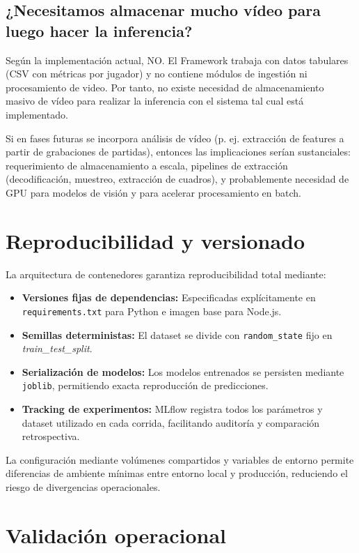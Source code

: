 \documentclass{ULBreport} %
\begin{document}
\subsection{¿Necesitamos almacenar mucho vídeo para luego hacer la inferencia?}

Según la implementación actual, NO. El Framework trabaja con datos tabulares (CSV con métricas por jugador) y no contiene módulos de ingestión ni procesamiento de video. Por tanto, no existe necesidad de almacenamiento masivo de vídeo para realizar la inferencia con el sistema tal cual está implementado.

Si en fases futuras se incorpora análisis de vídeo (p. ej. extracción de features a partir de grabaciones de partidas), entonces las implicaciones serían sustanciales: requerimiento de almacenamiento a escala, pipelines de extracción (decodificación, muestreo, extracción de cuadros), y probablemente necesidad de GPU para modelos de visión y para acelerar procesamiento en batch.

\section{Reproducibilidad y versionado}

La arquitectura de contenedores garantiza reproducibilidad total mediante:

\begin{itemize}
    \item \textbf{Versiones fijas de dependencias:} Especificadas explícitamente en \texttt{requirements.txt} para Python e imagen base para Node.js.
    \item \textbf{Semillas deterministas:} El dataset se divide con \texttt{random\_state} fijo en \textit{train\_test\_split}.
    \item \textbf{Serialización de modelos:} Los modelos entrenados se persisten mediante \texttt{joblib}, permitiendo exacta reproducción de predicciones.
    \item \textbf{Tracking de experimentos:} MLflow registra todos los parámetros y dataset utilizado en cada corrida, facilitando auditoría y comparación retrospectiva.
\end{itemize}

La configuración mediante volúmenes compartidos y variables de entorno permite diferencias de ambiente mínimas entre entorno local y producción, reduciendo el riesgo de divergencias operacionales.

\section{Validación operacional}
\end{document}
